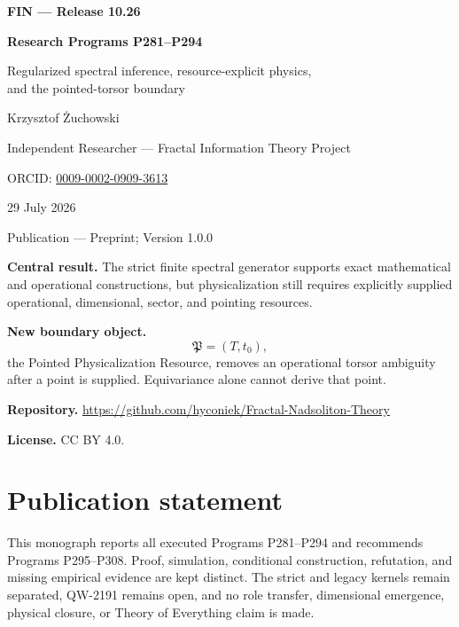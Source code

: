 \documentclass[11pt,a4paper,openany]{report}
\begin{document}
\hypersetup{pageanchor=false}
\begin{titlepage}
\centering
\vspace*{8mm}
{\Large\bfseries FIN --- Release 10.26\par}
\vspace{10mm}
{\Huge\bfseries Research Programs P281--P294\par}
\vspace{7mm}
{\Large Regularized spectral inference, resource-explicit physics,\\
and the pointed-torsor boundary\par}
\vspace{15mm}
{\Large Krzysztof \.Zuchowski\par}
\vspace{2mm}
{\normalsize Independent Researcher --- Fractal Information Theory Project\par}
\vspace{2mm}
{\normalsize ORCID:
\href{https://orcid.org/0009-0002-0909-3613}{0009-0002-0909-3613}\par}
\vspace{8mm}
{\large 29 July 2026\par}
{\normalsize Publication --- Preprint; Version 1.0.0\par}
\vfill
\begin{minipage}{0.91\textwidth}
\small
\textbf{Central result.}
The strict finite spectral generator supports exact mathematical and
operational constructions, but physicalization still requires explicitly
supplied operational, dimensional, sector, and pointing resources.

\medskip
\textbf{New boundary object.}
\[
\mathfrak P=(T,t_0),
\]
the Pointed Physicalization Resource, removes an operational torsor ambiguity
after a point is supplied. Equivariance alone cannot derive that point.

\medskip
\textbf{Repository.}
\url{https://github.com/hyconiek/Fractal-Nadsoliton-Theory}

\textbf{License.} CC BY 4.0.
\end{minipage}
\vfill
\end{titlepage}
\hypersetup{pageanchor=true}
\chapter*{Publication statement}
This monograph reports all executed Programs P281--P294 and recommends
Programs P295--P308. Proof, simulation, conditional construction, refutation,
and missing empirical evidence are kept distinct. The strict and legacy
kernels remain separated, QW-2191 remains open, and no role transfer,
dimensional emergence, physical closure, or Theory of Everything claim is
made.
\end{document}
